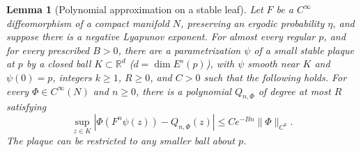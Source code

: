 \documentclass[11pt]{article}
\newtheorem{lemma}[theorem]{Lemma}
\theoremstyle{remark}
\newcommand{\R}{\mathbb R}
\begin{document}
\begin{lemma}[Polynomial approximation on a stable leaf]
\label{lem:polynomial}
Let \(F\) be a \(C^\infty\) diffeomorphism of a compact manifold \(N\),
preserving an ergodic probability \(\eta\), and suppose there is a
negative Lyapunov exponent.
For almost every regular \(p\), and for every prescribed \(B>0\),
there are a parametrization \(\psi\) of a small stable plaque at \(p\)
by a closed ball \(K\subset\R^d\) (\(d=\dim E^s(p)\)), with \(\psi\)
smooth near \(K\) and \(\psi(0)=p\),
integers \(k\ge1\), \(R\ge0\), and \(C>0\)
such that the following holds.
For every \(\Phi\in C^\infty(N)\) and \(n\ge0\), there is a polynomial
\(Q_{n,\Phi}\) of degree at most \(R\) satisfying
\begin{equation}\label{eq:poly-approx}
 \sup_{z\in K}
 \left|\Phi(F^n\psi(z))-Q_{n,\Phi}(z)\right|
       \le C e^{-Bn}\|\Phi\|_{C^k}.
\end{equation}
The plaque can be restricted to any smaller ball about \(p\).
\end{lemma}
\end{document}

